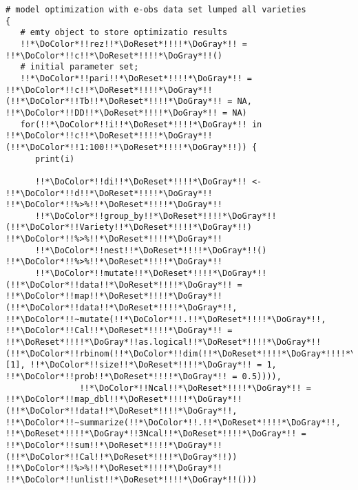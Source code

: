 \begin{verbatim}
# model optimization with e-obs data set lumped all varieties
{
   # emty object to store optimizatio results
   !!*\DoColor*!!rez!!*\DoReset*!!!!*\DoGray*!! = !!*\DoColor*!!c!!*\DoReset*!!!!*\DoGray*!!()
   # initial parameter set;
   !!*\DoColor*!!pari!!*\DoReset*!!!!*\DoGray*!! = !!*\DoColor*!!c!!*\DoReset*!!!!*\DoGray*!!(!!*\DoColor*!!Tb!!*\DoReset*!!!!*\DoGray*!! = NA, !!*\DoColor*!!DD!!*\DoReset*!!!!*\DoGray*!! = NA)
   for(!!*\DoColor*!!i!!*\DoReset*!!!!*\DoGray*!! in !!*\DoColor*!!c!!*\DoReset*!!!!*\DoGray*!!(!!*\DoColor*!!1:100!!*\DoReset*!!!!*\DoGray*!!)) {
      print(i)

      !!*\DoColor*!!di!!*\DoReset*!!!!*\DoGray*!! <- !!*\DoColor*!!d!!*\DoReset*!!!!*\DoGray*!! !!*\DoColor*!!%>%!!*\DoReset*!!!!*\DoGray*!!
      !!*\DoColor*!!group_by!!*\DoReset*!!!!*\DoGray*!!(!!*\DoColor*!!Variety!!*\DoReset*!!!!*\DoGray*!!) !!*\DoColor*!!%>%!!*\DoReset*!!!!*\DoGray*!!
      !!*\DoColor*!!nest!!*\DoReset*!!!!*\DoGray*!!() !!*\DoColor*!!%>%!!*\DoReset*!!!!*\DoGray*!!
      !!*\DoColor*!!mutate!!*\DoReset*!!!!*\DoGray*!!(!!*\DoColor*!!data!!*\DoReset*!!!!*\DoGray*!! = !!*\DoColor*!!map!!*\DoReset*!!!!*\DoGray*!!(!!*\DoColor*!!data!!*\DoReset*!!!!*\DoGray*!!, !!*\DoColor*!!~mutate(!!*\DoColor*!!.!!*\DoReset*!!!!*\DoGray*!!, !!*\DoColor*!!Cal!!*\DoReset*!!!!*\DoGray*!! = !!*\DoReset*!!!!*\DoGray*!!as.logical!!*\DoReset*!!!!*\DoGray*!!(!!*\DoColor*!!rbinom(!!*\DoColor*!!dim(!!*\DoReset*!!!!*\DoGray*!!!!*\DoReset*!!!!*\DoGray*!!.!!*\DoReset*!!!!*\DoGray*!!)[1], !!*\DoColor*!!size!!*\DoReset*!!!!*\DoGray*!! = 1, !!*\DoColor*!!prob!!*\DoReset*!!!!*\DoGray*!! = 0.5)))),
               !!*\DoColor*!!Ncal!!*\DoReset*!!!!*\DoGray*!! = !!*\DoColor*!!map_dbl!!*\DoReset*!!!!*\DoGray*!!(!!*\DoColor*!!data!!*\DoReset*!!!!*\DoGray*!!, !!*\DoColor*!!~summarize(!!*\DoColor*!!.!!*\DoReset*!!!!*\DoGray*!!, !!*\DoReset*!!!!*\DoGray*!!3Ncal!!*\DoReset*!!!!*\DoGray*!! = !!*\DoColor*!!sum!!*\DoReset*!!!!*\DoGray*!!(!!*\DoColor*!!Cal!!*\DoReset*!!!!*\DoGray*!!)) !!*\DoColor*!!%>%!!*\DoReset*!!!!*\DoGray*!! !!*\DoColor*!!unlist!!*\DoReset*!!!!*\DoGray*!!()))



\end{verbatim}
